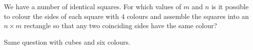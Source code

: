 We have a number of identical squares. For which values of $m$ and $n$ is it possible to colour the sides of each square with $4$ colours and assemble the squares into an $n \times m$ rectangle so that any two coinciding sides have the same colour?

Same question with cubes and six colours.
